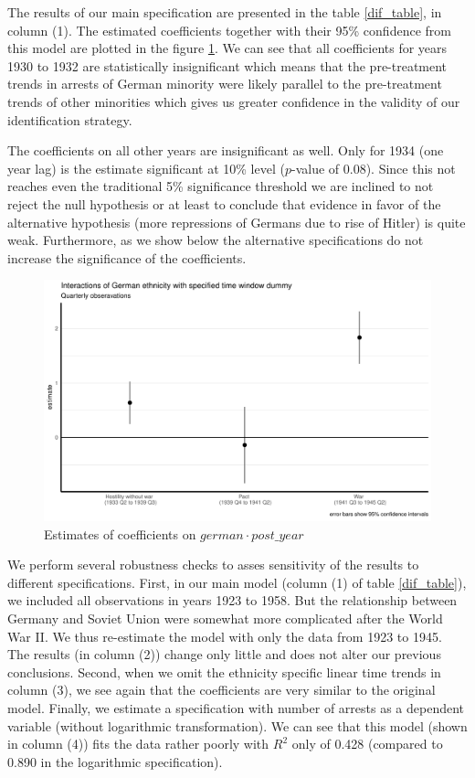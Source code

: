 The results of our main specification are presented in the table \ref{dif_table}, in column (1). The estimated coefficients together with their 95\% confidence  from this model are plotted in the figure \ref{fig_did_effets}. We can see that all coefficients for years 1930 to 1932 are statistically insignificant which means that the pre-treatment trends in arrests of German minority were likely parallel to the pre-treatment trends of other minorities which gives us greater  confidence in the validity of our identification strategy. 

The coefficients on all other years are insignificant as well. Only for 1934 (one year lag) is the estimate  significant at 10\% level ($p$-value of 0.08). Since this not reaches even the traditional 5\% significance threshold we are inclined to not reject the null hypothesis or at least to conclude that evidence in favor of the alternative hypothesis (more repressions of Germans due to rise of Hitler) is quite weak.  Furthermore, as we show below the alternative specifications do not increase the significance of the coefficients.
\begin{figure}[h]
\centering
\includegraphics[width=1.1\textwidth]{plots/did_effects_quart_window.pdf}
\caption{Estimates of coefficients on $german \cdot post\_year$}
\label{fig_did_effets}
\end{figure}
We perform several robustness checks to asses sensitivity of the results to different specifications. First, in our main model (column (1) of table \ref{dif_table}), we included all observations in years 1923 to 1958. But the relationship between Germany and Soviet Union were somewhat more complicated after the World War II. We thus re-estimate the model with only the data from 1923 to 1945. The results (in column (2)) change only little and does not alter our previous conclusions. Second, when we omit the ethnicity specific linear time trends in column (3), we see again that the coefficients are very similar to the original model. 
Finally, we estimate a specification with number of arrests as a dependent variable (without logarithmic transformation). We can see that this model (shown in column (4)) fits the data rather poorly with  $R^2$ only of 0.428 (compared to 0.890 in the logarithmic specification). 